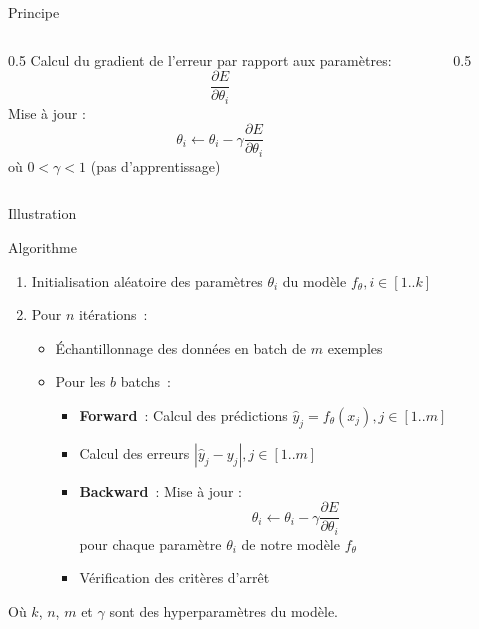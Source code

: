 
\begin{frame}{Principe}
  \begin{columns}
    \begin{column}{0.5\tw}
      Calcul du gradient de l'erreur par rapport aux paramètres:
      \[
        \frac{\partial{E}}{\partial{\theta_i}}
      \]
      Mise à jour :
      \[
        \theta_i \leftarrow \theta_i - \gamma\frac{\partial{E}}{\partial{\theta_i}}
      \]
      où $0 < \gamma < 1$ (pas d'apprentissage)
    \end{column}
    \begin{column}{0.5\tw}
    \end{column}
  \end{columns}
\end{frame}

\begin{frame}{Illustration}
\end{frame}

\begin{frame}{Algorithme}
  \begin{enumerate}
    \item Initialisation aléatoire des paramètres $\theta_i$ du modèle $f_{\theta}, i\in[1..k]$
    \item Pour $n$ itérations~:
      \begin{itemize}
        \item Échantillonnage des données en batch de $m$ exemples
        \item Pour les $b$ batchs~:
        \begin{itemize}
          \item \textbf{Forward}~: Calcul des prédictions $\hat{y}_j = f_{\theta}(x_j), j\in[1..m]$
          \item Calcul des erreurs $|\hat{y}_j-y_j|, j\in[1..m]$
          \item \textbf{Backward}~: Mise à jour :
          \[
            \theta_i \leftarrow \theta_i - \gamma\frac{\partial{E}}{\partial{\theta_i}}
          \]
          pour chaque paramètre $\theta_i$ de notre modèle $f_\theta$ \\$\,$

          \item Vérification des critères d'arrêt
        \end{itemize}
      \end{itemize}
  \end{enumerate}

  Où $k$, $n$, $m$ et $\gamma$ sont des hyperparamètres du modèle.
\end{frame}


